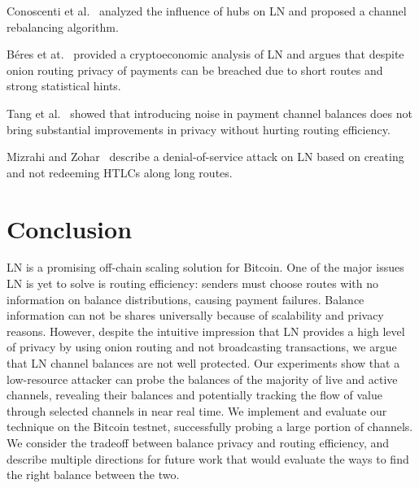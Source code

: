 

Conoscenti et al.~\cite{Conoscenti2019} analyzed the influence of hubs on LN and proposed a channel rebalancing algorithm.

B{\'{e}}res et at.~\cite{Beres2019} provided a cryptoeconomic analysis of LN and argues that despite onion routing privacy of payments can be breached due to short routes and strong statistical hints.

Tang et al.~\cite{Tang2019} showed that introducing noise in payment channel balances does not bring substantial improvements in privacy without hurting routing efficiency.

Mizrahi and Zohar~\cite{Mizrahi2020} describe a denial-of-service attack on LN based on creating and not redeeming HTLCs along long routes.


\section{Conclusion} \label{sec:conclusion}
LN is a promising off-chain scaling solution for Bitcoin.
One of the major issues LN is yet to solve is routing efficiency: senders must choose routes with no information on balance distributions, causing payment failures.
Balance information can not be shares universally because of scalability and privacy reasons.
However, despite the intuitive impression that LN provides a high level of privacy by using onion routing and not broadcasting transactions, we argue that LN channel balances are not well protected.
Our experiments show that a low-resource attacker can probe the balances of the majority of live and active channels, revealing their balances and potentially tracking the flow of value through selected channels in near real time.
We implement and evaluate our technique on the Bitcoin testnet, successfully probing a large portion of channels.
We consider the tradeoff between balance privacy and routing efficiency, and describe multiple directions for future work that would evaluate the ways to find the right balance between the two.



